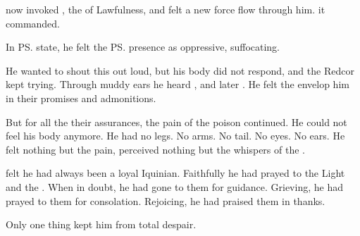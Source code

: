\begin{garbage}
% 
% 

\Camilienne{} now invoked , the \Sephirah{} of Lawfulness, and \Icor{} felt a new force flow through him. 
 it commanded. 

In \ps{\Icor}{} state, he felt the \ps{\sephirah} presence as oppressive, suffocating. 

He wanted to shout this out loud, but his body did not respond, and the Redcor \soror{} kept trying. 
Through muddy ears he heard , and later . 
He felt the \Sephiroth{} envelop him in their promises and admonitions. 

But for all the their assurances, the pain of the poison continued. 
He could not feel his body anymore. 
He had no legs. 
No arms. 
No tail. 
No eyes. 
No ears. 
He felt nothing but the pain, perceived nothing but the whispers of the \Archons. 

% 
% 

\Icor{} felt he had always been a loyal Iquinian. 
Faithfully he had prayed to the Light and the \Sephiroth. 
When in doubt, he had gone to them for guidance. 
Grieving, he had prayed to them for consolation. 
Rejoicing, he had praised them in thanks. 


Only one thing kept him from total despair. 


\end{garbage}
